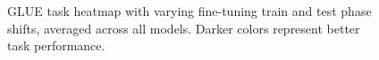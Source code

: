 \begin{figure}
    \centering
    \caption{GLUE task heatmap with varying fine-tuning train and test phase shifts, averaged across all models. Darker colors represent better task performance.}
    \label{fig:glue_phaseshift}
\end{figure}